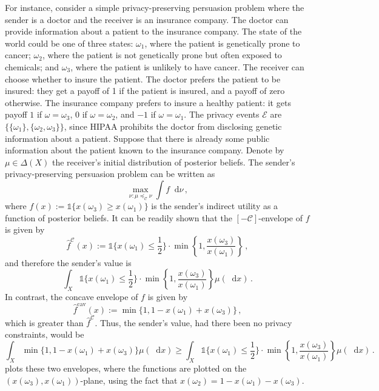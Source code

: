 \documentclass[12pt,letterpaper]{article}
\newenvironment{original}{\color{black}}{}
\theoremstyle{plain}
\theoremstyle{definition}
\theoremstyle{remark}
\newcommand{\C}{\mathcal{C}}
\newcommand{\ind}{\mathds{1}}
\renewcommand*\d{\mathop{}\!\mathrm{d}}
\theoremstyle{definition}
\begin{document}
\begin{original}
For instance, consider a simple privacy-preserving persuasion problem where the sender is a doctor and the receiver is an insurance company. The doctor can provide information about a patient to the insurance company. The state of the world could be one of three states: $\omega_1$, where the patient is genetically prone to cancer; $\omega_2$, where the patient is not genetically prone but often exposed to chemicals; and $\omega_3$, where the patient is unlikely to have cancer. The receiver can choose whether to insure the patient. The doctor prefers the patient to be insured: they get a payoff of 1 if the patient is insured, and a payoff of zero otherwise. The insurance company prefers to insure a healthy patient: it gets payoff $1$ if $\omega=\omega_3$, $0$ if $\omega=\omega_2$, and $-1$ if $\omega=\omega_1$. The privacy events $\mathcal{E}$ are $\{\{\omega_1\},\{\omega_2,\omega_3\}\}$, since HIPAA prohibits the doctor from disclosing genetic information about a patient. Suppose that there is already some public information about the patient known to the insurance company. Denote by $\mu \in \Delta(X)$ the receiver's initial distribution of posterior beliefs. The sender's privacy-preserving persuasion problem can be written as
\[
\max_{\nu: \mu \preceq_{\C} \nu} \int f \d \nu\,,
\]
where $f(x):=\ind\{x(\omega_3) \geq x(\omega_1)\}$ is the sender's indirect utility as a function of posterior beliefs. It can be readily shown that the $[-\C]$-envelope of $f$ is given by
\[
\widehat{f}^\C(x):=\ind\Big\{x(\omega_1) \leq \frac{1}{2}\Big\}\cdot \min\left\{1,\frac{x(\omega_3)}{x(\omega_1)}\right\}\,,
\]
and therefore the sender's value is
\[
\int_X \ind\Big\{x(\omega_1) \leq \frac{1}{2}\Big\}\cdot \min\left\{1,\frac{x(\omega_3)}{x(\omega_1)}\right\} \mu(\d x)\,.
\]
In contrast, the concave envelope of $f$ is given by
\[
\widehat{f}^{\text{cav}}(x):=\min\Big\{1,1-x(\omega_1)+x(\omega_3)\Big\}\,,\]
which is greater than $\widehat{f}^\C$. Thus, the sender's value, had there been no privacy constraints, would be
\[
\int_X \min\Big\{1,1-x(\omega_1)+x(\omega_3)\Big\}  \mu(\d x) \geq \int_X \ind\Big\{x(\omega_1) \leq \frac{1}{2}\Big\}\cdot \min\left\{1,\frac{x(\omega_3)}{x(\omega_1)}\right\} \mu(\d x)\,.
\]
 plots these two envelopes, where the functions are plotted on the $(x(\omega_3),x(\omega_1))$-plane, using the fact that $x(\omega_2)=1-x(\omega_1)-x(\omega_3)$.
\end{original}
\end{document}
